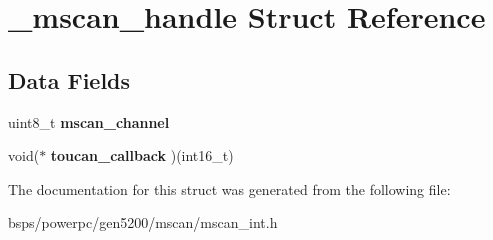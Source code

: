 \hypertarget{struct__mscan__handle}{}\section{\+\_\+mscan\+\_\+handle Struct Reference}
\label{struct__mscan__handle}
\subsection*{Data Fields}
\begin{DoxyCompactItemize}
\item 
\mbox{\label{struct__mscan__handle_ac7cce2d6da34537fbb218ad7a5c9e484}} 
uint8\+\_\+t {\bfseries mscan\+\_\+channel}
\item 
\mbox{\label{struct__mscan__handle_aa257b8a97075c49ed4348f87305afff5}} 
void($\ast$ {\bfseries toucan\+\_\+callback} )(int16\+\_\+t)
\end{DoxyCompactItemize}


The documentation for this struct was generated from the following file\+:\begin{DoxyCompactItemize}
\item 
bsps/powerpc/gen5200/mscan/mscan\+\_\+int.\+h\end{DoxyCompactItemize}
